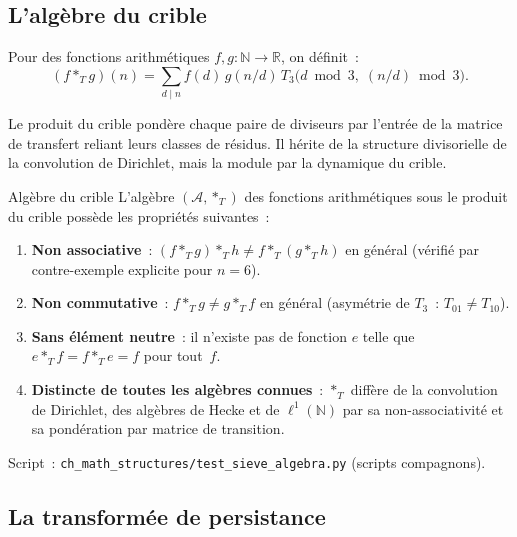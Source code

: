 \documentclass[12pt,a4paper]{article}
\begin{document}
\subsection{L'algèbre du crible}
\label{sec:ms_algebra}

\begin{definition}
\label{def:sieve_product}
Pour des fonctions arithmétiques $f, g\colon \mathbb{N} \to
\mathbb{R}$, on définit~:
\begin{equation}
  (f *_T g)(n) = \sum_{d \mid n} f(d)\, g(n/d)\,
    T_3\bigl(d \bmod 3,\; (n/d) \bmod 3\bigr).
  \label{eq:sieve_product}
\end{equation}
\end{definition}

Le produit du crible pondère chaque paire de diviseurs par l'entrée de
la matrice de transfert reliant leurs classes de résidus. Il hérite
de la structure divisorielle de la convolution de Dirichlet, mais la
module par la dynamique du crible.

\begin{thmbox}{Algèbre du crible}
\label{thm:sieve_algebra}
L'algèbre $(\mathcal{A}, *_T)$ des fonctions arithmétiques sous le
produit du crible possède les propriétés suivantes~:
\begin{enumerate}[nosep]
\item \textbf{Non associative}~: $(f *_T g) *_T h \neq f *_T (g *_T h)$
  en général (vérifié par contre-exemple explicite pour $n = 6$).
\item \textbf{Non commutative}~: $f *_T g \neq g *_T f$ en général
  (asymétrie de $T_3$~: $T_{01} \neq T_{10}$).
\item \textbf{Sans élément neutre}~: il n'existe pas de fonction $e$
  telle que $e *_T f = f *_T e = f$ pour tout~$f$.
\item \textbf{Distincte de toutes les algèbres connues}~: $*_T$
  diffère de la convolution de Dirichlet, des algèbres de Hecke et de
  $\ell^1(\mathbb{N})$ par sa non-associativité et sa pondération par
  matrice de transition.
\end{enumerate}
Script~: \texttt{ch\_math\_structures/test\_sieve\_algebra.py}
(scripts compagnons).
\end{thmbox}


\subsection{La transformée de persistance}
\label{sec:ms_transform}
\end{document}
